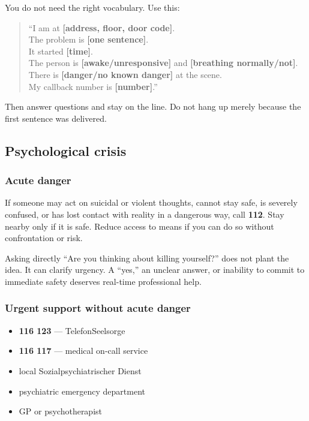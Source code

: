 You do not need the right vocabulary. Use this:

\begin{quote}
``I am at \textbf{{[}address, floor, door code{]}}.\\
The problem is \textbf{{[}one sentence{]}}.\\
It started \textbf{{[}time{]}}.\\
The person is \textbf{{[}awake/unresponsive{]}} and \textbf{{[}breathing
normally/not{]}}.\\
There is \textbf{{[}danger/no known danger{]}} at the scene.\\
My callback number is \textbf{{[}number{]}}.''
\end{quote}

Then answer questions and stay on the line. Do not hang up merely
because the first sentence was delivered.

\hypertarget{psychological-crisis}{%
\subsection{Psychological crisis}\label{psychological-crisis}}

\hypertarget{acute-danger}{%
\subsubsection{Acute danger}\label{acute-danger}}

If someone may act on suicidal or violent thoughts, cannot stay safe, is
severely confused, or has lost contact with reality in a dangerous way,
call \textbf{112}. Stay nearby only if it is safe. Reduce access to
means if you can do so without confrontation or risk.

Asking directly ``Are you thinking about killing yourself?'' does not
plant the idea. It can clarify urgency. A ``yes,'' an unclear answer, or
inability to commit to immediate safety deserves real-time professional
help.

\hypertarget{urgent-support-without-acute-danger}{%
\subsubsection{Urgent support without acute
danger}\label{urgent-support-without-acute-danger}}

\begin{itemize}
\tightlist
\item
  \textbf{116 123} --- TelefonSeelsorge
\item
  \textbf{116 117} --- medical on-call service
\item
  local Sozialpsychiatrischer Dienst
\item
  psychiatric emergency department
\item
  GP or psychotherapist
\end{itemize}

